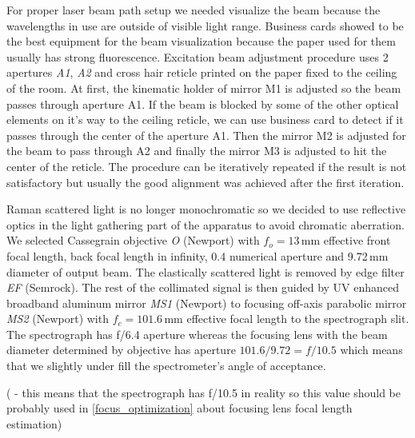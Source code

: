 For proper laser beam path setup we needed visualize the beam because the
wavelengths in use are outside of visible light range. Business cards showed
to be the best equipment for the beam visualization because the paper used for
them usually has strong fluorescence. Excitation beam adjustment procedure
uses 2 apertures \emph{A1}, \emph{A2} and cross hair reticle printed on the
paper fixed to the ceiling of the room. At first, the kinematic holder of
mirror M1 is adjusted so the beam passes through aperture A1. If the beam is
blocked by some of the other optical elements on it's way to the ceiling
reticle, we can use business card to detect if it passes through the center
of the aperture A1. Then the mirror M2 is adjusted for the beam to pass
through A2 and finally the mirror M3 is adjusted to hit the center of the
reticle. The procedure can be iteratively repeated if the result is not
satisfactory but usually the good alignment was achieved after the first
iteration.

Raman scattered light is no longer monochromatic so we decided to use
reflective optics in the light gathering part of the apparatus to avoid
chromatic aberration. We selected Cassegrain objective \emph{O} (Newport) with
$f_o = 13$\,mm effective front focal length, back focal length in infinity,
0.4 numerical aperture and 9.72\,mm diameter of output beam. The elastically
scattered light is removed by edge filter \emph{EF} (Semrock). The rest of the
collimated signal is then guided by UV enhanced broadband aluminum mirror
\emph{MS1} (Newport) to focusing off-axis parabolic mirror \emph{MS2}
(Newport) with $f_c = 101.6$\,mm effective focal length to the spectrograph
slit. The spectrograph has f/6.4 aperture whereas the focusing lens with the
beam diameter determined by objective has aperture $101.6 / 9.72 = f/10.5$
which means that we slightly under fill the spectrometer's angle of acceptance.

(\INCONSISTENCY{} - this means that the spectrograph has f/10.5 in reality so
this value should be probably used in \cref{focus_optimization} about
focusing lens focal length estimation)
